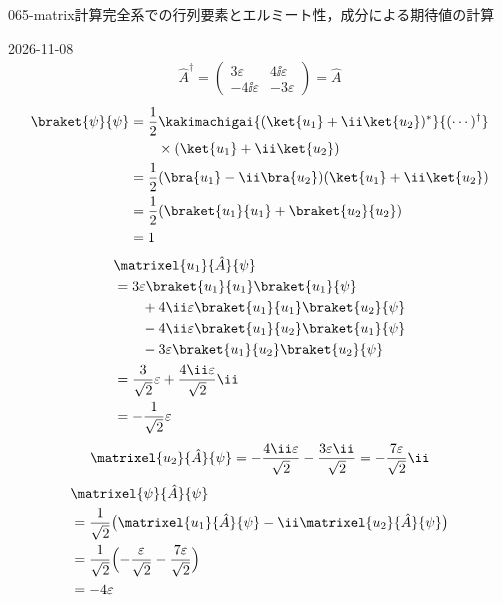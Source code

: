 \documentclass[uplatex,dvipdfmx,a4paper,11pt]{jsarticle}
\begin{document}
\begin{mondai}{065-matrix}{計算}{完全系での行列要素とエルミート性，成分による期待値の計算}
\begin{kotaeutsushi}{2026-11-08}
\begin{gather*}
\hat{A}^{\dagger}=\begin{pmatrix}3\varepsilon&4\ii\varepsilon\\-4\ii\varepsilon&-3\varepsilon\end{pmatrix}=\hat{A}
\end{gather*}
\begin{align*}
\braket{\psi}{\psi}&=\frac{1}{2}\kakimachigai{(\ket{u_{1}}+\ii\ket{u_{2}})^{*}}{(\cdots)^{\dagger}}\\
&\qquad\times(\ket{u_{1}}+\ii\ket{u_{2}})\\
&=\frac{1}{2}(\bra{u_{1}}-\ii\bra{u_{2}})(\ket{u_{1}}+\ii\ket{u_{2}})\\
&=\frac{1}{2}(\braket{u_{1}}{u_{1}}+\braket{u_{2}}{u_{2}})\\
&=1
\end{align*}
\begin{align*}
&\matrixel{u_{1}}{\hat{A}}{\psi}\\
&=3\varepsilon\braket{u_{1}}{u_{1}}\braket{u_{1}}{\psi}\\
&\qquad+4\ii\varepsilon\braket{u_{1}}{u_{1}}\braket{u_{2}}{\psi}\\
&\qquad-4\ii\varepsilon\braket{u_{1}}{u_{2}}\braket{u_{1}}{\psi}\\
&\qquad-3\varepsilon\braket{u_{1}}{u_{2}}\braket{u_{2}}{\psi}\\
&=\frac{3}{\sqrt{2}}\varepsilon+\frac{4\ii\varepsilon}{\sqrt{2}}\ii\\
&=-\frac{1}{\sqrt{2}}\varepsilon
\end{align*}
\[ \matrixel{u_{2}}{\hat{A}}{\psi}=-\frac{4\ii\varepsilon}{\sqrt{2}}-\frac{3\varepsilon\ii}{\sqrt{2}}=-\frac{7\varepsilon}{\sqrt{2}}\ii \]
\begin{align*}
&\matrixel{\psi}{\hat{A}}{\psi}\\
&=\frac{1}{\sqrt{2}}\bigl(\matrixel{u_{1}}{\hat{A}}{\psi}-\ii\matrixel{u_{2}}{\hat{A}}{\psi}\bigr)\\
&=\frac{1}{\sqrt{2}}\Bigl(-\frac{\varepsilon}{\sqrt{2}}-\frac{7\varepsilon}{\sqrt{2}}\Bigr)\\
&=-4\varepsilon
\end{align*}
\end{kotaeutsushi}
\end{mondai}
\end{document}
